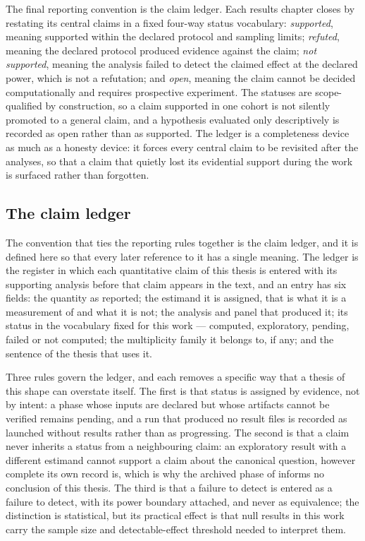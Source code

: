 The final reporting convention is the claim ledger. Each results chapter closes by restating its central claims in a fixed four-way status vocabulary: \emph{supported}, meaning supported within the declared protocol and sampling limits; \emph{refuted}, meaning the declared protocol produced evidence against the claim; \emph{not supported}, meaning the analysis failed to detect the claimed effect at the declared power, which is not a refutation; and \emph{open}, meaning the claim cannot be decided computationally and requires prospective experiment. The statuses are scope-qualified by construction, so a claim supported in one cohort is not silently promoted to a general claim, and a hypothesis evaluated only descriptively is recorded as open rather than as supported. The ledger is a completeness device as much as a honesty device: it forces every central claim to be revisited after the analyses, so that a claim that quietly lost its evidential support during the work is surfaced rather than forgotten.

\subsection{The claim ledger}

The convention that ties the reporting rules together is the claim ledger, and it is defined here so that every later reference to it has a single meaning. The ledger is the register in which each quantitative claim of this thesis is entered with its supporting analysis before that claim appears in the text, and an entry has six fields: the quantity as reported; the estimand it is assigned, that is what it is a measurement of and what it is not; the analysis and panel that produced it; its status in the vocabulary fixed for this work --- computed, exploratory, pending, failed or not computed; the multiplicity family it belongs to, if any; and the sentence of the thesis that uses it.

Three rules govern the ledger, and each removes a specific way that a thesis of this shape can overstate itself. The first is that status is assigned by evidence, not by intent: a phase whose inputs are declared but whose artifacts cannot be verified remains pending, and a run that produced no result files is recorded as launched without results rather than as progressing. The second is that a claim never inherits a status from a neighbouring claim: an exploratory result with a different estimand cannot support a claim about the canonical question, however complete its own record is, which is why the archived phase of  informs no conclusion of this thesis. The third is that a failure to detect is entered as a failure to detect, with its power boundary attached, and never as equivalence; the distinction is statistical, but its practical effect is that null results in this work carry the sample size and detectable-effect threshold needed to interpret them.

